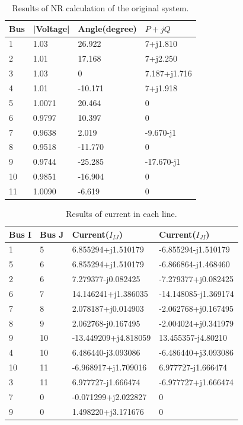\documentclass[conference]{IEEEtran}
\begin{document}
\begin{table}[H]
	\begin{center}
		\begin{tabular}{|l|l|l|l|}
			\hline
			Bus & |Voltage| & Angle(degree) & $P+jQ$ \\ \hline
			1 & 1.03 & 26.922 & 7+j1.810 \\ \hline
			2 & 1.01 & 17.168 & 7+j2.250 \\ \hline
			3 & 1.03 & 0 & 7.187+j1.716 \\ \hline
			4 & 1.01 & -10.171 & 7+j1.918 \\ \hline
			5 & 1.0071 & 20.464 & 0 \\ \hline
			6 & 0.9797 & 10.397 & 0 \\ \hline
			7 & 0.9638 & 2.019 & -9.670-j1 \\ \hline
			8 & 0.9518 & -11.770 & 0 \\ \hline
			9 & 0.9744 & -25.285 & -17.670-j1 \\ \hline
			10 & 0.9851 & -16.904 & 0 \\ \hline
			11 & 1.0090 & -6.619 & 0 \\ \hline
		\end{tabular}
	\end{center}
	\caption{Results of NR calculation of the original system.}
	\vspace{-6mm}
	\label{tab:nr1}
\end{table}

\begin{table}[H]
	\begin{center}
		\begin{tabular}{|l|l|l|l|}
			\hline
			Bus I & Bus J & Current($I_{IJ}$) & Current($I_{JI}$) \\ \hline
			1 & 5 & 6.855294+j1.510179 & -6.855294-j1.510179 \\ \hline
			5 & 6 & 6.855294+j1.510179 & -6.866864-j1.468460 \\ \hline
			2 & 6 & 7.279377-j0.082425 & -7.279377+j0.082425 \\ \hline
			6 & 7 & 14.146241+j1.386035 & -14.148085-j1.369174 \\ \hline
			7 & 8 & 2.078187+j0.014903 & -2.062768+j0.167495 \\ \hline
			8 & 9 & 2.062768-j0.167495 & -2.004024+j0.341979 \\ \hline
			9 & 10 & -13.449209+j4.818059 & 13.455357-j4.80210 \\ \hline
			4 & 10 & 6.486440-j3.093086 & -6.486440+j3.093086 \\ \hline
			10 & 11 & -6.968917+j1.709016 & 6.977727-j1.666474 \\ \hline
			3 & 11 & 6.977727-j1.666474 & -6.977727+j1.666474 \\ \hline
			7 & 0 & -0.071299+j2.022827 & 0 \\ \hline
			9 & 0 & 1.498220+j3.171676 & 0 \\ \hline
		\end{tabular}
	\end{center}
	\caption{Results of current in each line.}
	\vspace{-6mm}
	\label{tab:c1}
\end{table}
\end{document}
